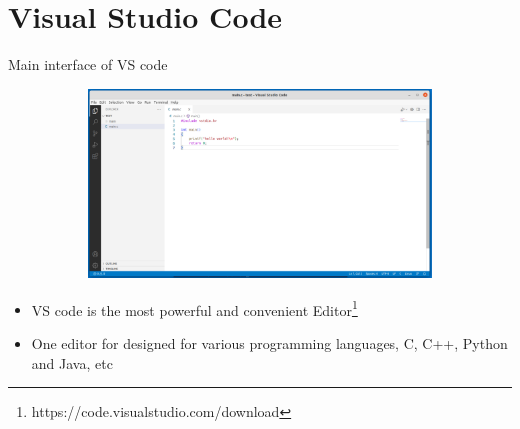 \section{Visual Studio Code}
\label{sec:vs}
\begin{frame}{Main interface of VS code}
	\begin{figure}
		\begin{center}
			\begin{figure}
				\includegraphics[width=0.8\linewidth]{figs/vscode.pdf}
			\end{figure}
		\end{center}
	\end{figure}
	\begin{itemize}
		\item {VS code is the most powerful and convenient Editor\footnote{https://code.visualstudio.com/download}}
		\item {One editor for designed for various programming languages, C, C++, Python and Java, etc}
	\end{itemize}
\end{frame}
